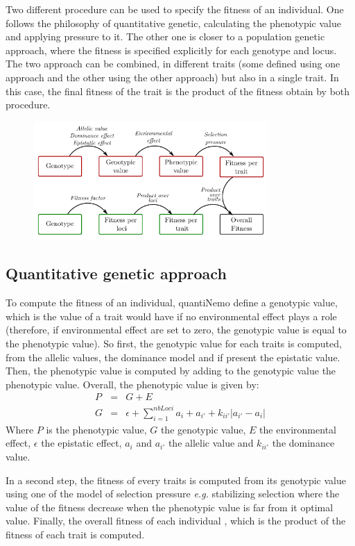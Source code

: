 \documentclass[letterpaper,12pt,oneside]{book}
\begin{document}
Two different procedure can be used to specify the fitness of an individual. One follows the philosophy of quantitative genetic, calculating the phenotypic value and applying pressure to it. The other one is closer to a population genetic approach, where the fitness is specified explicitly for each genotype and locus. The two approach can be combined, in different traits (some defined using one approach and the other using the other approach) but also in a single trait. In this case, the final fitness of the trait is the product of the fitness obtain by both procedure. 
\begin{figure}[h]
	\centering
		\includegraphics[width=0.80\textwidth]{selection.pdf}
	\label{fig:life-cycle}
\end{figure}
\subsection{Quantitative genetic approach}
To compute the fitness of an individual, quantiNemo define a genotypic value, which is the value of a trait would have if no environmental effect plays a role (therefore, if environmental effect are set to zero, the genotypic value is equal to the phenotypic value). So first, the genotypic value for each traits is computed, from the allelic values, the dominance model and if present the epistatic value. Then, the phenotypic value is computed by adding to the genotypic value the phenotypic value. Overall, the phenotypic value is given by:
\begin{eqnarray}
P &=& G + E \\
G&=&\epsilon+\sum_{i=1}^{nbLoci}a_i+a_{i'}+k_{ii'}|a_{i'}-a_i| 
\end{eqnarray}
Where $P$ is the phenotypic value, $G$ the genotypic value, $E$ the environmental effect, $\epsilon$ the epistatic effect, $a_i$ and $a_{i'}$ the allelic value and $k_{ii'}$ the dominance value. 

In a second step, the fitness of every traits is computed from its genotypic value using one of the model of selection pressure \textit{e.g.} stabilizing selection where the value of the fitness decrease when the phenotypic value is far from it optimal value. Finally, the overall fitness of each individual , which is the product of the fitness of each trait is computed.
\end{document}
